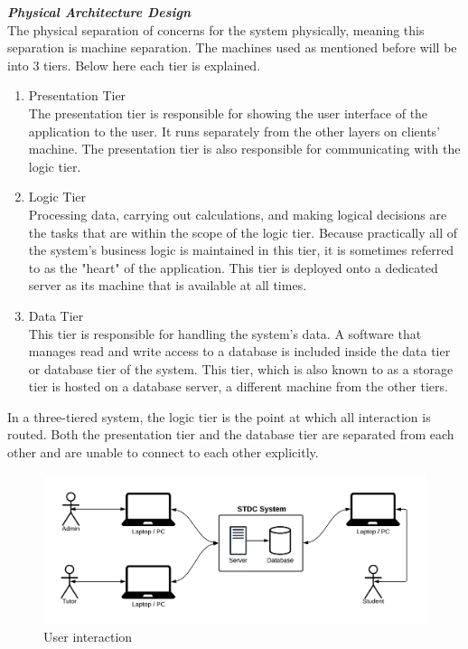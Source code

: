 \begin{justify}
\vspace{0.25cm}
\newendline \textbf{\textit{Physical Architecture Design}}\\
The physical separation of concerns for the system physically, meaning this separation is machine separation. The machines used as mentioned before will be into 3 tiers. Below here each tier is explained.
\begin{enumerate}[itemsep=-0.15cm]
    \item Presentation Tier\\The presentation tier is responsible for showing the user interface of the application to the user. It runs separately from the other layers on clients’ machine. The presentation tier is also responsible for communicating with the logic tier.
    \item Logic Tier\\Processing data, carrying out calculations, and making logical decisions are the tasks that are within the scope of the logic tier. Because practically all of the system's business logic is maintained in this tier, it is sometimes referred to as the "heart" of the application. This tier is deployed onto a dedicated server as its machine that is available at all times.
    \item Data Tier\\This tier is responsible for handling the system’s data. A software that manages read and write access to a database is included inside the data tier or database tier of the system. This tier, which is also known to as a storage tier is hosted on a database server, a different machine from the other tiers.
\end{enumerate}

\vspace{0.25cm}
\noindent In a three-tiered system, the logic tier is the point at which all interaction is routed. Both the presentation tier and the database tier are separated from each other and are unable to connect to each other explicitly.

\begin{figure}[H]
    \centerline{\includegraphics[width=150mm,scale=1]{figures/analysis_and_design/design/User Interaction V1.png}}
    \caption{User interaction}
    \label{UserInteraction}
\end{figure}


\end{justify}
